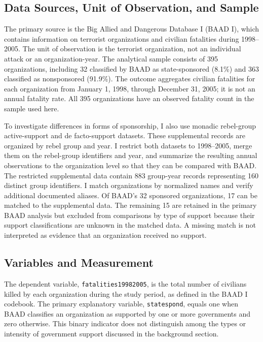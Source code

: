 \documentclass{article}
\begin{document}
\subsection{Data Sources, Unit of Observation, and Sample}

The primary source is the Big Allied and Dangerous Database I (BAAD I), which contains information on terrorist organizations and civilian fatalities during 1998--2005. The unit of observation is the terrorist organization, not an individual attack or an organization-year. The analytical sample consists of 395 organizations, including 32 classified by BAAD as state-sponsored (8.1\%) and 363 classified as nonsponsored (91.9\%). The outcome aggregates civilian fatalities for each organization from January 1, 1998, through December 31, 2005; it is not an annual fatality rate. All 395 organizations have an observed fatality count in the sample used here.

To investigate differences in forms of sponsorship, I also use monadic rebel-group active-support and de facto-support datasets. These supplemental records are organized by rebel group and year. I restrict both datasets to 1998--2005, merge them on the rebel-group identifiers and year, and summarize the resulting annual observations to the organization level so that they can be compared with BAAD. The restricted supplemental data contain 883 group-year records representing 160 distinct group identifiers. I match organizations by normalized names and verify additional documented aliases. Of BAAD's 32 sponsored organizations, 17 can be matched to the supplemental data. The remaining 15 are retained in the primary BAAD analysis but excluded from comparisons by type of support because their support classifications are unknown in the matched data. A missing match is not interpreted as evidence that an organization received no support.

\subsection{Variables and Measurement}

The dependent variable, \texttt{fatalities19982005}, is the total number of civilians killed by each organization during the study period, as defined in the BAAD I codebook. The primary explanatory variable, \texttt{statespond}, equals one when BAAD classifies an organization as supported by one or more governments and zero otherwise. This binary indicator does not distinguish among the types or intensity of government support discussed in the background section.
\end{document}
